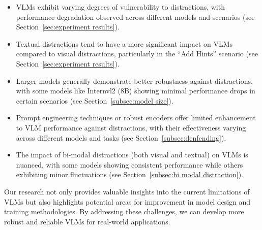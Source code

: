 \begin{itemize}[leftmargin=2em]
\setlength\itemsep{0em}
    \item VLMs exhibit varying degrees of vulnerability to distractions, with performance degradation observed across different models and scenarios (see Section~\ref{sec:experiment results}).
    \item Textual distractions tend to have a more significant impact on VLMs compared to visual distractions, particularly in the ``Add Hints'' scenario (see Section~\ref{sec:experiment results}).
    \item Larger models generally demonstrate better robustness against distractions, with some models like Internvl2 (8B) showing minimal performance drops in certain scenarios (see Section~\ref{subsec:model size}).
    \item Prompt engineering techniques or robust encoders offer limited enhancement to VLM performance against distractions, with their effectiveness varying across different models and tasks (see Section~\ref{subsec:denfending}). 
    \item The impact of bi-modal distractions (both visual and textual) on VLMs is nuanced, with some models showing consistent performance while others exhibiting minor fluctuations (see Section~\ref{subsec:bi modal distraction}).
\end{itemize}

Our research not only provides valuable insights into the current limitations of VLMs but also highlights potential areas for improvement in model design and training methodologies. By addressing these challenges, we can develop more robust and reliable VLMs for real-world applications.